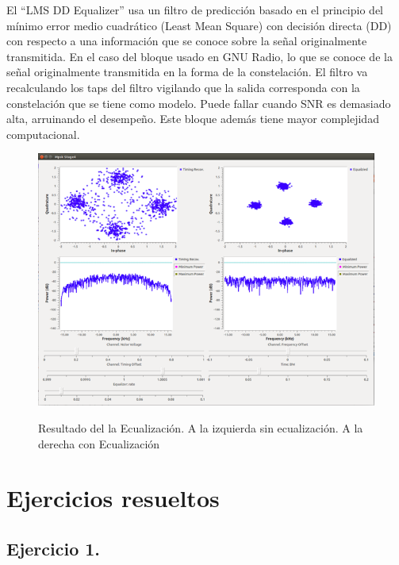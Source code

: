 El “LMS DD Equalizer” usa un filtro de predicción basado en el principio del mínimo error medio cuadrático (Least Mean Square) con decisión directa (DD) con respecto a una información que se conoce sobre la señal originalmente transmitida. En el caso del bloque usado en GNU Radio, lo que se conoce de la señal originalmente transmitida en la forma de la constelación. El filtro va recalculando los taps del filtro vigilando que la salida corresponda con la constelación que se tiene como modelo. Puede fallar cuando SNR es demasiado alta, arruinando el desempeño. Este bloque además tiene mayor complejidad computacional. \\

\vspace{300px}
\begin{figure}[h!]
	\captionsetup{justification = raggedright, singlelinecheck = false}
	\caption{Resultado del la Ecualización. A la izquierda sin ecualización. A la derecha con Ecualización} 
	\centering
	\includegraphics[scale=1]{Imagenes/Flujograma-gnu.png}
	\label{fig:Flujograma-gnu}
\end{figure}


\section{Ejercicios resueltos}
\subsection{Ejercicio 1.}
